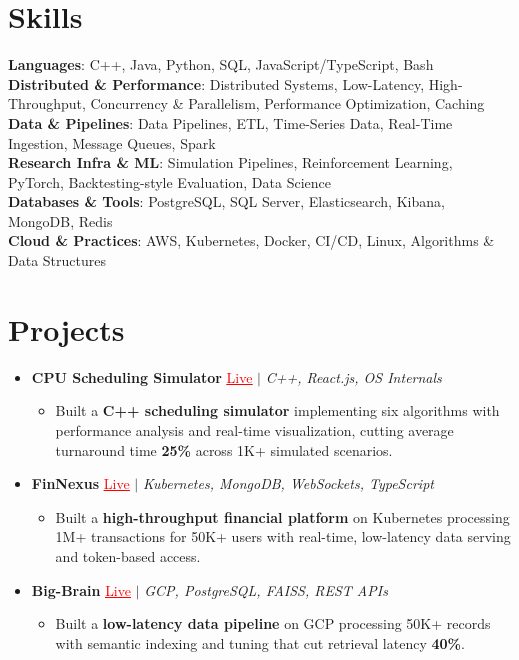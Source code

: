\documentclass[letterpaper,10pt]{article}
\newcommand{\resumeItem}[1]{\item\small{{#1 \vspace{-2pt}}}}
\newcommand{\resumeProjectHeading}[1]{\item \small #1 \vspace{-2pt}}
\newcommand{\resumeSubHeadingListStart}{\begin{itemize}[leftmargin=0.0in, label={}]}
\newcommand{\resumeSubHeadingListEnd}{\end{itemize}}
\newcommand{\resumeProjItemListStart}{\begin{itemize}[leftmargin=0.15in,label=\textbullet,itemsep=0pt,topsep=0pt,parsep=0pt,partopsep=0pt]}
\newcommand{\resumeProjItemListEnd}{\end{itemize}\vspace{-4pt}}
\begin{document}
\section{Skills}
\begin{itemize}[leftmargin=0.15in, label={}]
\small{\item{
\textbf{Languages}: C++, Java, Python, SQL, JavaScript/TypeScript, Bash \\
\textbf{Distributed \& Performance}: Distributed Systems, Low-Latency, High-Throughput, Concurrency \& Parallelism, Performance Optimization, Caching \\
\textbf{Data \& Pipelines}: Data Pipelines, ETL, Time-Series Data, Real-Time Ingestion, Message Queues, Spark \\
\textbf{Research Infra \& ML}: Simulation Pipelines, Reinforcement Learning, PyTorch, Backtesting-style Evaluation, Data Science \\
\textbf{Databases \& Tools}: PostgreSQL, SQL Server, Elasticsearch, Kibana, MongoDB, Redis \\
\textbf{Cloud \& Practices}: AWS, Kubernetes, Docker, CI/CD, Linux, Algorithms \& Data Structures
}}
\end{itemize}
\vspace{-6pt}
\section{Projects}
\resumeSubHeadingListStart
\vspace{-2pt}
\resumeProjectHeading{\textbf{CPU Scheduling Simulator} {\href{https://cpu-scheduler-amber.vercel.app/}{\textcolor{red}{\underline{Live}}}} $|$ \emph{C++, React.js, OS Internals}}
\resumeProjItemListStart
\resumeItem{Built a \textbf{C++ scheduling simulator} implementing six algorithms with performance analysis and real-time visualization, cutting average turnaround time \textbf{25\%} across 1K+ simulated scenarios.}
\resumeProjItemListEnd
\vspace{3pt}
\resumeProjectHeading{\textbf{FinNexus} {\href{https://fin-nexus.vercel.app/}{\textcolor{red}{\underline{Live}}}} $|$ \emph{Kubernetes, MongoDB, WebSockets, TypeScript}}
\resumeProjItemListStart
\resumeItem{Built a \textbf{high-throughput financial platform} on Kubernetes processing 1M+ transactions for 50K+ users with real-time, low-latency data serving and token-based access.}
\resumeProjItemListEnd
\vspace{3pt}
\resumeProjectHeading{\textbf{Big-Brain} {\href{https://big-brain-pied.vercel.app/}{\textcolor{red}{\underline{Live}}}} $|$ \emph{GCP, PostgreSQL, FAISS, REST APIs}}
\resumeProjItemListStart
\resumeItem{Built a \textbf{low-latency data pipeline} on GCP processing 50K+ records with semantic indexing and tuning that cut retrieval latency \textbf{40\%}.}
\resumeProjItemListEnd
\resumeSubHeadingListEnd
\end{document}
